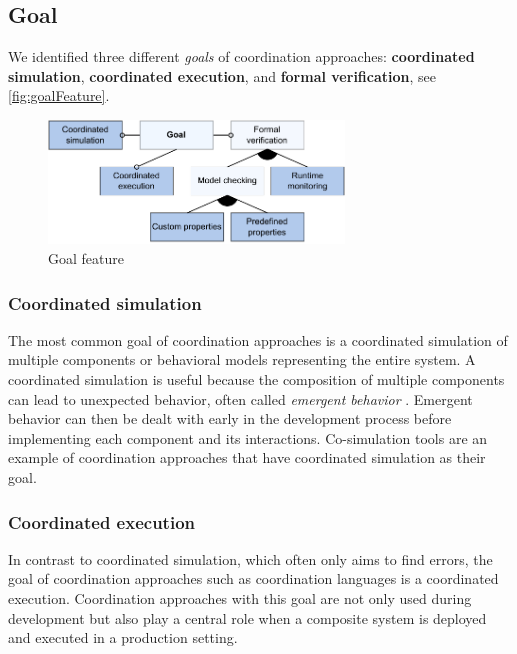 \documentclass[runningheads]{llncs}
\begin{document}
\subsection{Goal} %
We identified three different \textit{goals} of coordination approaches: \textbf{coordinated simulation}, \textbf{coordinated execution}, and \textbf{formal verification}, see \autoref{fig:goalFeature}.

\begin{figure}[ht]
	\centering
	\includegraphics[width=0.7\textwidth]{images/goal_feature}
	\caption{Goal feature}
	\label{fig:goalFeature}
\end{figure}

\subsubsection{Coordinated simulation} The most common goal of coordination approaches is a coordinated simulation of multiple components or behavioral models representing the entire system.
A coordinated simulation is useful because the composition of multiple components can lead to unexpected behavior, often called \textit{emergent behavior} \cite{ekerTamingHeterogeneityPtolemy2003}.
Emergent behavior can then be dealt with early in the development process before implementing each component and its interactions.
Co-simulation tools are an example of coordination approaches that have coordinated simulation as their goal.

\subsubsection{Coordinated execution} In contrast to coordinated simulation, which often only aims to find errors, the goal of coordination approaches such as coordination languages is a coordinated execution.
Coordination approaches with this goal are not only used during development but also play a central role when a composite system is deployed and executed in a production setting.
\end{document}
